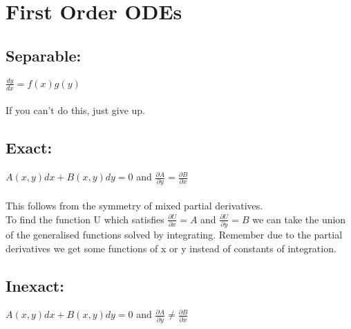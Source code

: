 \documentclass{report}
\begin{document}
\section*{First Order ODEs}
\large{
\subsection*{\textbf{Separable:}}
	 $\frac{dy}{dx} = f(x)g(y)$ \\ \\ If you can't do this, just give up.

\subsection*{\textbf{Exact:}} $A(x,y)dx + B(x,y)dy = 0$ and $\frac{\partial A}{\partial y} = \frac{\partial B}{\partial x}$ \\ \\This follows from the symmetry of mixed partial derivatives.
\\ To find the function U which satisfies $\frac{\partial U}{\partial x} = A$ and $\frac{\partial U}{\partial y} = B$ we can take the union of the generalised functions solved by integrating. Remember due to the partial derivatives we get some functions of x or y instead of constants of integration.

\subsection*{\textbf{Inexact:}} $A(x,y)dx + B(x,y)dy = 0$ and $\frac{\partial A}{\partial y} \neq \frac{\partial B}{\partial x}$






}
\end{document}
